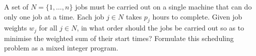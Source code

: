 A set of $N = \{1,\dots,n\}$ jobs must be carried out on a single machine that can do only one job at a time. Each job $j\in N$ takes $p_j$ hours to complete. Given job weights $w_j$ for all $j\in N$, in what order should the jobs be carried out so as to minimise the weighted sum of their start times? Formulate this scheduling problem as a mixed integer program. 

